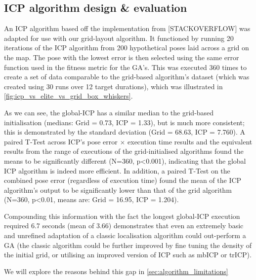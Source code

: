 \documentclass[authoryearcitations]{UoYCSproject}
\begin{document}
\subsection{ICP algorithm design \& evaluation}
\label{subsec:icp_benchmark}
An ICP algorithm based off the implementation from [STACKOVERFLOW] was adapted for use with our grid-layout algorithm. It functioned by running 20 iterations of the ICP algorithm from 200 hypothetical poses laid across a grid on the map. The pose with the lowest error is then selected using the same error function used in the fitness metric for the GA's. This was executed 360 times to create a set of data comparable to the grid-based algorithm's dataset (which was created using 30 runs over 12 target durations), which was illustrated in \autoref{fig:icp_vs_elite_vs_grid_box_whiskers}. 

As we can see, the global-ICP has a similar median to the grid-based initialisation (medians: Grid = 0.73, ICP = 1.33), but is much more consistent; this is demonstrated by the standard deviation (Grid = 68.63, ICP = 7.760). A paired T-Test across ICP's pose error $\times$ execution time results and the equivalent results from the range of executions of the grid-initialised algorithms found the means to be significantly different (N=360, p<0.001), indicating that the global ICP algorithm is indeed more efficient. In addition, a paired T-Test on the combined pose error (regardless of execution time) found the mean of the ICP algorithm's output to be significantly lower than that of the grid algorithm (N=360, p<0.01, means are: Grid = 16.95, ICP = 1.204). 

Compounding this information with the fact the longest global-ICP execution required 6.7 seconds (mean of 3.66) demonstrates that even an extremely basic and unrefined adaptation of a classic localisation algorithm could out-perform a GA (the classic algorithm could be further improved by fine tuning the density of the initial grid, or utilising an improved version of ICP such as mbICP or trICP).

We will explore the reasons behind this gap in \autoref{sec:algorithm_limitations}
\end{document}
